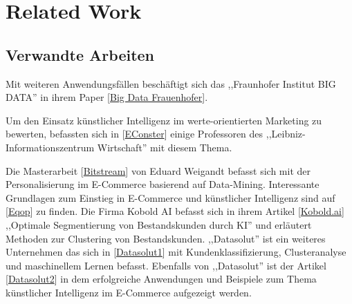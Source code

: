\chapter{Related Work}

\section{Verwandte Arbeiten}
Mit weiteren Anwendungsfällen beschäftigt sich das ,,Fraunhofer Institut BIG DATA'' in ihrem Paper [\href{https://www.bigdata-ai.fraunhofer.de/content/dam/bigdata/de/documents/Publikationen/KI-Potenzialanalyse_2017.pdf}{Big Data Frauenhofer}].\vspace{0.2cm}

Um den Einsatz künstlicher Intelligenz im werte-orientierten Marketing zu bewerten, befassten sich in [\href{https://www.econstor.eu/bitstream/10419/222610/1/1725938928.pdf}{EConster}] einige Professoren des ,,Leibniz-Informationszentrum Wirtschaft'' mit diesem Thema.\vspace{0.2cm}

Die Masterarbeit [\href{https://reposit.haw-hamburg.de/bitstream/20.500.12738/7932/1/master_thesis.pdf}{Bitstream}] von Eduard Weigandt befasst sich mit der Personalisierung im E-Commerce basierend auf Data-Mining. Interessante Grundlagen zum Einstieg in E-Commerce und künstlicher Intelligenz sind auf [\href{https://www.epoq.de/blog}{Eqop}] zu finden. Die Firma Kobold AI befasst sich in ihrem Artikel [\href{https://www.kobold.ai/kundensegmentierung-ki}{Kobold.ai}] ,,Optimale Segmentierung von Bestandskunden durch KI'' und erläutert Methoden zur Clustering von Bestandskunden. ,,Datasolut'' ist ein weiteres Unternehmen das sich in [\href{https://datasolut.com/kundenklassifizierung-definition-vorteile-und-methoden}{Datasolut1}] mit Kundenklassifizierung, Clusteranalyse und maschinellem Lernen befasst. Ebenfalls von ,,Datasolut'' ist der Artikel [\href{https://datasolut.com/ki-im-e-commerce}{Datasolut2}] in dem erfolgreiche Anwendungen und Beispiele zum Thema künstlicher Intelligenz im E-Commerce aufgezeigt werden.

